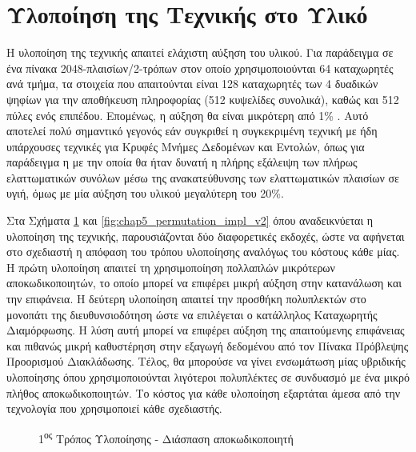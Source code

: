 
\section{Υλοποίηση της Τεχνικής στο Υλικό}
\label{chap5_HardwareImplementation}

Η υλοποίηση της τεχνικής απαιτεί ελάχιστη αύξηση του υλικού. Για παράδειγμα σε ένα πίνακα 2048-πλαισίων/2-τρόπων στον οποίο χρησιμοποιούνται 64 καταχωρητές ανά τμήμα, τα στοιχεία που απαιτούνται είναι 128 καταχωρητές των 4 δυαδικών ψηφίων για την αποθήκευση πληροφορίας (512 κυψελίδες συνολικά), καθώς και 512 πύλες \xor ενός επιπέδου. Επομένως, η αύξηση θα είναι μικρότερη από 1\% . Αυτό αποτελεί πολύ σημαντικό γεγονός εάν συγκριθεί η συγκεκριμένη τεχνική με ήδη υπάρχουσες τεχνικές για Κρυφές Μνήμες Δεδομένων και Εντολών, όπως για παράδειγμα η \cite{shirvani1999padded} με την οποία θα ήταν δυνατή η πλήρης εξάλειψη των πλήρως ελαττωματικών συνόλων μέσω της ανακατεύθυνσης των ελαττωματικών πλαισίων σε υγιή, όμως με μία αύξηση του υλικού μεγαλύτερη του 20\%.
\par
Στα Σχήματα \ref{fig:chap5_permutation_impl_v1} και \ref{fig:chap5_permutation_impl_v2} όπου αναδεικνύεται η υλοποίηση της τεχνικής, παρουσιάζονται δύο διαφορετικές εκδοχές, ώστε να αφήνεται στο σχεδιαστή η απόφαση του τρόπου υλοποίησης αναλόγως του κόστους κάθε μίας. Η πρώτη υλοποίηση απαιτεί τη χρησιμοποίηση πολλαπλών μικρότερων αποκωδικοποιητών, το οποίο μπορεί να επιφέρει μικρή αύξηση στην κατανάλωση και την επιφάνεια. Η δεύτερη υλοποίηση απαιτεί την προσθήκη πολυπλεκτών στο μονοπάτι της διευθυνσιοδότηση ώστε να επιλέγεται ο κατάλληλος Καταχωρητής Διαμόρφωσης. Η λύση αυτή μπορεί να επιφέρει αύξηση της απαιτούμενης επιφάνειας και πιθανώς μικρή καθυστέρηση στην εξαγωγή δεδομένου από τον Πίνακα Πρόβλεψης Προορισμού Διακλάδωσης. Τέλος, θα μπορούσε να γίνει ενσωμάτωση μίας υβριδικής υλοποίησης όπου χρησιμοποιούνται λιγότεροι πολυπλέκτες σε συνδυασμό με ένα μικρό πλήθος αποκωδικοποιητών. Το κόστος για κάθε υλοποίηση εξαρτάται άμεσα από την τεχνολογία που χρησιμοποιεί κάθε σχεδιαστής.

\begin{figure}[h]
    \centering
    \caption{1\textsuperscript{ος} Τρόπος Υλοποίησης - Διάσπαση αποκωδικοποιητή}
    \label{fig:chap5_permutation_impl_v1}
\end{figure}

